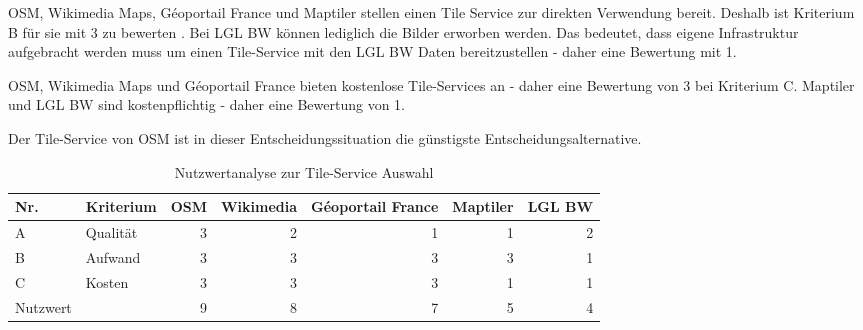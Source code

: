 \ac{OSM}, Wikimedia Maps, Géoportail France und Maptiler stellen einen Tile Service zur direkten Verwendung bereit. Deshalb ist Kriterium B für sie mit 3 zu bewerten \autocite[vgl.][]{ign.od} \autocite[vgl.][]{wikimedia.oda} \autocite[vgl.][]{OMS.oda}.
Bei \ac{LGL BW} können lediglich die Bilder erworben werden. Das bedeutet, dass eigene Infrastruktur aufgebracht werden muss um einen Tile-Service mit den \ac{LGL BW} Daten bereitzustellen \autocite[vgl.][]{lglbw.odb} - daher eine Bewertung mit 1.

\ac{OSM}, Wikimedia Maps und Géoportail France bieten kostenlose Tile-Services an \autocite[vgl.][]{ign.od} \autocite[vgl.][]{wikimedia.oda} \autocite[vgl.][]{OMS.oda} - daher eine Bewertung von 3 bei Kriterium C.
Maptiler und \ac{LGL BW} sind kostenpflichtig \autocite[vgl.][]{lglbw.odb} \autocite[vgl][]{MapTiler.odb} - daher eine Bewertung von 1.

Der Tile-Service von \ac{OSM} ist in dieser Entscheidungssituation die günstigste Entscheidungsalternative.

\begin{table}[h]
	\caption{Nutzwertanalyse zur Tile-Service Auswahl}
	\begin{center}
		\begin{tabular}{llrrrrr}
			\toprule
			Nr.      & Kriterium & \multicolumn{1}{l}{OSM} & \multicolumn{1}{l}{Wikimedia} & \multicolumn{1}{l}{Géoportail France} & \multicolumn{1}{l}{Maptiler} & \multicolumn{1}{l}{LGL BW} \\ \midrule
			A        &  Qualität &                       3 &                             2 &                                     1 &                            1 & 2                          \\
			B        &   Aufwand &                       3 &                             3 &                                     3 &                            3 & 1                          \\
			C        &    Kosten &                       3 &                             3 &                                     3 &                            1 & 1                          \\ \midrule
			Nutzwert &           &                       9 &                             8 &                                     7 &                            5 & 4                          \\ \bottomrule
		\end{tabular}
	\end{center}
	\label{tab:tile-nutzerwertanalyse}
\end{table}

